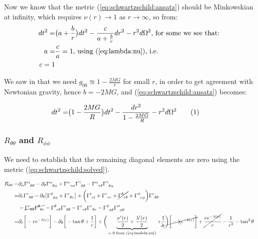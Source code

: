 \documentclass[]{article}
\newcommand\numberthis{\addtocounter{equation}{1}\tag{\theequation}}
\begin{document}
Now we know that the metric (\ref{eq:schwartzschild:ansatz}) should be Minkowskian at infinity, which requires $\nu(r)\rightarrow 1$ as $r \rightarrow \infty$, so from:
\begin{align*}
	dt^2 =& \big(a + \frac{b}{r}\big) dt^2 - \frac{c}{a + \frac{b}{r}} dr^2 -r^2 d  \Omega^2 \text{, for some we see that:}\\
	a =& \frac{c}{a}=1 \text{, using (\ref{eq:lambda:nu}), i.e.} \\
	c=1
\end{align*}

We saw in \cite[Lecture 5]{susskind2012general} that we need $g_{00}\approxeq1-\frac{2MG}{r}$ for small $r$, in order to get agreement with Newtonian gravity, hence $b=-2MG$, and (\ref{eq:schwartzschild:ansatz}) becomes:

\begin{align*}
	dt^2 =& \big(1-\frac{2MG}{R}\big) dt^2 - \frac{dr^2}{1-\frac{2MG}{R}}  -r^2 d  \Omega^2 \numberthis \label{eq:schwartzschild:solved}
\end{align*}

\subsubsection{$R_{\theta\theta}$ and $R_{\phi\phi}$}
We need to establish that the remaining diagonal elements are zero using the metric (\ref{eq:schwartzschild:solved}).

\begin{align*}
	R_{\theta\theta} =& \partial_\alpha \Gamma\indices{^\alpha_{\theta\theta}} - \partial_\theta \Gamma\indices{^\alpha_{\theta\alpha}} + \Gamma\indices{^\alpha_{\gamma\alpha}} \Gamma\indices{^\gamma_{\theta\theta}} - \Gamma\indices{^\alpha_{\gamma\theta}} \Gamma\indices{^\gamma_{\theta\alpha}}\\
	=& \partial_r \Gamma\indices{^r_{\theta\theta}} - \partial_\theta \big[\Gamma\indices{^\phi_{\theta\phi}}+\Gamma\indices{^r_{\theta r}}\big] + \bigg(\Gamma\indices{^t_{rt}}+\Gamma\indices{^r_{rr}}+\cancel{\Gamma\indices{^\theta_{r\theta}}}+\Gamma\indices{^\phi_{r\phi}}\bigg) \Gamma\indices{^r_{\theta\theta}}\\ &-\cancel{ \Gamma\indices{^r_{\theta\theta}} \Gamma\indices{^\theta_{\theta r}}}  - \Gamma\indices{^\theta_{r\theta}} \Gamma\indices{^r_{\theta\theta}} -\Gamma\indices{^r_{r\theta}} \Gamma\indices{^r_{\theta r}} - \Gamma\indices{^\phi_{\phi\theta}} \Gamma\indices{^\phi_{\phi\theta}}\\
	=& \partial_r \bigg[-r  e^{-\lambda(r)}\bigg] - \partial_\theta \bigg[-\tan \theta +\frac{1}{r}\bigg]  + \bigg(\underbrace{\frac{\nu^\prime(r)}{2}+\frac{\lambda^\prime(r)}{2}}_\text{$=0$ from (\ref{eq:lambda:nu})}+\cancel{\frac{1}{\bcancel{r}}\bigg)\bigg[ -\bcancel{r}  e^{-\lambda(r)}\bigg]} + \cancel{\frac{r e^{-\lambda(r)}}{r}}	 -\frac{1}{r^2} - \tan^2 \theta 
\end{align*}
\end{document}
